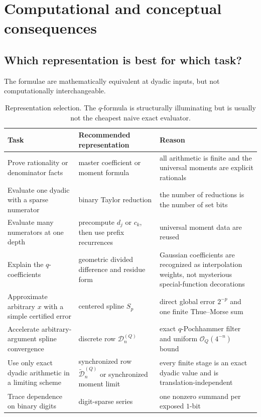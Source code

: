 \documentclass[11pt,oneside]{article}
\theoremstyle{definition}
\theoremstyle{remark}
\newcommand{\bigO}{\mathcal O}
\begin{document}
\section{Computational and conceptual consequences}
\label{dyadicweb:sec:consequences}

\subsection{Which representation is best for which task?}

The formulae are mathematically equivalent at dyadic inputs, but not computationally
interchangeable.

\begin{table}[ht]
\centering
\small
\begin{tabularx}{\textwidth}{@{}p{}p{}X@{}}
\toprule
Task & Recommended representation & Reason \\
\midrule
Prove rationality or denominator facts & master coefficient or moment formula & all arithmetic is finite and the universal moments are explicit rationals \\
Evaluate one dyadic with a sparse numerator & binary Taylor reduction & the number of reductions is the number of set bits \\
Evaluate many numerators at one depth & precompute $d_j$ or $c_k$, then use prefix recurrences & universal moment data are reused \\
Explain the $q$-coefficients & geometric divided difference and residue form & Gaussian coefficients are recognized as interpolation weights, not mysterious special-function decorations \\
Approximate arbitrary $x$ with a simple certified error & centered spline $S_p$ & direct global error $2^{-p}$ and one finite Thue--Morse sum \\
Accelerate arbitrary-argument spline convergence & discrete row $\mathcal D_n^{(Q)}$ & exact $q$-Pochhammer filter and uniform $\bigO_Q(4^{-n})$ bound \\
Use only exact dyadic arithmetic in a limiting scheme & synchronized row $\widetilde{\mathcal D}_n^{(Q)}$ or synchronized moment limit & every finite stage is an exact dyadic value and is translation-independent \\
Trace dependence on binary digits & digit-sparse series & one nonzero summand per exposed $1$-bit \\
\bottomrule
\end{tabularx}
\caption{Representation selection.  The $q$-formula is structurally illuminating but is
usually not the cheapest naive exact evaluator.}
\label{dyadicweb:tab:representation-selection}
\end{table}
\end{document}
